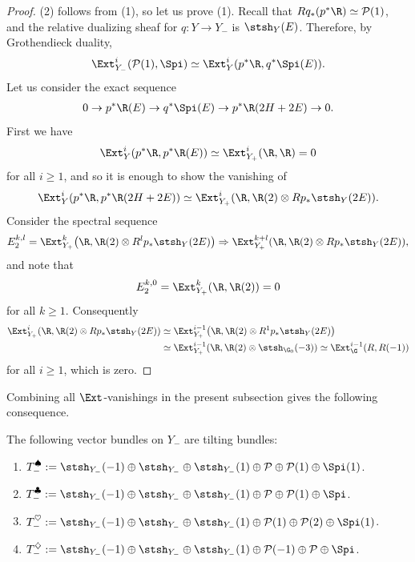 \begin{proof}
(2) follows from (1), so let us prove (1).
Recall that $Rq_*(p^*\R) \simeq \mathcal{P}(1)$, and
the relative dualizing sheaf for $q\colon Y \to Y_-$ is $\stsh_Y(E)$.
Therefore, by Grothendieck duality,
\begin{gather*}
\Ext_{Y_-}^{i}(\mathcal{P}(1), \Spi) \simeq \Ext_{Y}^{i}(p^*\R, q^*\Spi(E)).
\end{gather*}
Let us consider the exact sequence
\begin{gather*}
0 \to p^*\R(E) \to q^*\Spi(E) \to p^*\R(2H+2E) \to 0.
\end{gather*}
First we have
\begin{gather*}
\Ext_Y^i(p^*\R, p^*\R(E)) \simeq \Ext_{Y_+}^i(\R, \R) = 0
\end{gather*}
for all $i \geq 1$, and so
it is enough to show the vanishing of
\begin{gather*}
\Ext_Y^{i}(p^*\R, p^*\R(2H+2E)) \simeq \Ext_{Y_+}^{i}(\R, \R(2) \otimes Rp_*\stsh_Y(2E)).
\end{gather*}
Consider the spectral sequence
\begin{gather*}
E_2^{k,l} = \Ext_{Y_+}^{k}\big(\R, \R(2) \otimes R^lp_*\stsh_Y(2E)\big) \Rightarrow \Ext_{Y_+}^{k+l}(\R, \R(2) \otimes Rp_*\stsh_Y(2E)),
\end{gather*}
and note that
\begin{gather*}
E_2^{k,0} = \Ext_{Y_+}^{k}(\R, \R(2)) = 0
\end{gather*}
for all $k \geq 1$.
Consequently
\begin{align*}
\Ext_{Y_+}^{i}(\R, \R(2) \otimes Rp_*\stsh_Y(2E)) &\simeq \Ext_{Y_+}^{i-1}\big(\R, \R(2) \otimes R^1p_*\stsh_Y(2E)\big) \\
&\simeq \Ext_{Y_+}^{i-1}(\R, \R(2) \otimes \stsh_{\G_0}(-3))
\simeq \Ext_{\G}^{i-1}(R, R(-1))
\end{align*}
for all $i \geq 1$, which is zero.
\end{proof}

Combining all $\Ext$-vanishings in the present subsection gives the following consequence.

\begin{Theorem}
The following vector bundles on $Y_-$ are tilting bundles:
\begin{enumerate}\itemsep=0pt
\item[$1.$] $T_-^{\spadesuit} := \stsh_{Y_-}(-1) \oplus \stsh_{Y_-} \oplus \stsh_{Y_-}(1) \oplus \mathcal{P} \oplus \mathcal{P}(1) \oplus \Spi(1)$.
\item[$2.$] $T_-^{\clubsuit} := \stsh_{Y_-}(-1) \oplus \stsh_{Y_-} \oplus \stsh_{Y_-}(1) \oplus \mathcal{P} \oplus \mathcal{P}(1) \oplus \Spi$.
\item[$3.$] $T_-^{\heartsuit} := \stsh_{Y_-}(-1) \oplus \stsh_{Y_-} \oplus \stsh_{Y_-}(1) \oplus \mathcal{P}(1) \oplus \mathcal{P}(2) \oplus \Spi(1)$.
\item[$4.$] $T_-^{\diamondsuit} := \stsh_{Y_-}(-1) \oplus \stsh_{Y_-} \oplus \stsh_{Y_-}(1) \oplus \mathcal{P}(-1) \oplus \mathcal{P} \oplus \Spi$.
\end{enumerate}
\end{Theorem}

